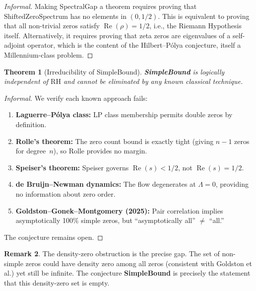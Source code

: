 \documentclass[12pt, a4paper]{article}
\theoremstyle{plain}
\newtheorem{theorem}{Theorem}[section]
\theoremstyle{definition}
\newtheorem{remark}[theorem]{Remark}
\newcommand{\re}{\operatorname{Re}}
\newcommand{\RH}{\mathrm{RH}}
\begin{document}
\begin{proof}[Informal]
Making SpectralGap a theorem requires proving that
$\mathrm{ShiftedZeroSpectrum}$ has no elements in $(0, 1/2)$.
This is equivalent to proving that all non-trivial zeros satisfy $\re(\rho) = 1/2$,
i.e., the Riemann Hypothesis itself.
Alternatively, it requires proving that zeta zeros are eigenvalues of a
self-adjoint operator, which is the content of the Hilbert--P\'olya conjecture,
itself a Millennium-class problem.
\end{proof}

\begin{theorem}[Irreducibility of SimpleBound]
\label{thm:sb_irreducible}
\textbf{SimpleBound} is logically independent of $\RH$ and cannot be
eliminated by any known classical technique.
\end{theorem}

\begin{proof}[Informal]
We verify each known approach fails:
\begin{enumerate}
  \item \textbf{Laguerre--P\'olya class:}
        LP class membership permits double zeros by definition.
  \item \textbf{Rolle's theorem:}
        The zero count bound is exactly tight (giving $n-1$ zeros for
        degree~$n$), so Rolle provides no margin.
  \item \textbf{Speiser's theorem:}
        Speiser governs $\re(s) < 1/2$, not $\re(s) = 1/2$.
  \item \textbf{de Bruijn--Newman dynamics:}
        The flow degenerates at $\Lambda = 0$, providing no information
        about zero order.
  \item \textbf{Goldston--Gonek--Montgomery (2025):}
        Pair correlation implies asymptotically 100\% simple zeros,
        but ``asymptotically all'' $\neq$ ``all.''
\end{enumerate}
The conjecture remains open.
\end{proof}

\begin{remark}
The density-zero obstruction is the precise gap.
The set of non-simple zeros could have density zero among all zeros
(consistent with Goldston et al.) yet still be infinite.
The conjecture \textbf{SimpleBound} is precisely the statement that this
density-zero set is empty.
\end{remark}

\end{document}
